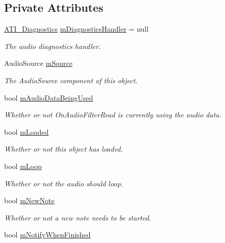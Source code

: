 \subsection*{Private Attributes}
\begin{DoxyCompactItemize}
\item 
\hyperlink{group___audio_testing_class_a_t_i___diagnostics}{A\+T\+I\+\_\+\+Diagnostics} \hyperlink{group___n_o_o_priv_var_gacd4376d2314caafc831cc049e9ca58d8}{m\+Diagnostics\+Handler} = null
\begin{DoxyCompactList}\small\item\em The audio diagnostics handler. \end{DoxyCompactList}\item 
Audio\+Source \hyperlink{group___n_o_o_priv_var_gad5e14a91b348e61166dbf6b6cf13649c}{m\+Source}
\begin{DoxyCompactList}\small\item\em The Audio\+Source component of this object. \end{DoxyCompactList}\item 
bool \hyperlink{group___n_o_o_priv_var_ga1efa96121f085b27c7d9e8725f90a336}{m\+Audio\+Data\+Being\+Used}
\begin{DoxyCompactList}\small\item\em Whether or not On\+Audio\+Filter\+Read is currently using the audio data. \end{DoxyCompactList}\item 
bool \hyperlink{group___n_o_o_priv_var_gaf01d2583555de6a523cdf82808718ca9}{m\+Loaded}
\begin{DoxyCompactList}\small\item\em Whether or not this object has loaded. \end{DoxyCompactList}\item 
bool \hyperlink{group___n_o_o_priv_var_gabf1d5013f44773e9fd3e4dbb59d74aeb}{m\+Loop}
\begin{DoxyCompactList}\small\item\em Whether or not the audio should loop. \end{DoxyCompactList}\item 
bool \hyperlink{group___n_o_o_priv_var_gac537ec036adf0645dca2f31fbc5b3dec}{m\+New\+Note}
\begin{DoxyCompactList}\small\item\em Whether or not a new note needs to be started. \end{DoxyCompactList}\item 
bool \hyperlink{group___n_o_o_priv_var_gaf72dd5943487433966b20b973be1e8b3}{m\+Notify\+When\+Finished}

\end{DoxyCompactItemize}
